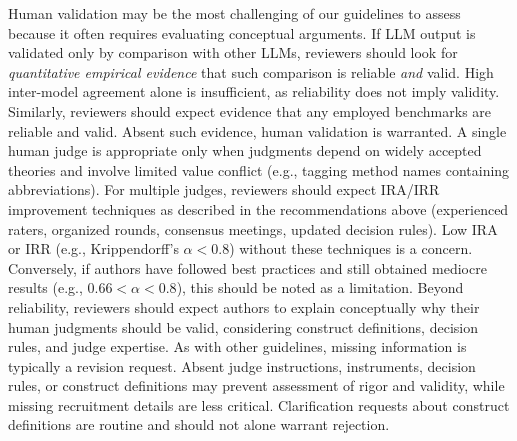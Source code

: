 Human validation may be the most challenging of our guidelines to assess because it often requires evaluating conceptual arguments. If LLM output is validated only by comparison with other LLMs, reviewers should look for \textit{quantitative empirical evidence} that such comparison is reliable \textit{and} valid. High inter-model agreement alone is insufficient, as reliability does not imply validity. Similarly, reviewers should expect evidence that any employed benchmarks are reliable and valid. Absent such evidence, human validation is warranted.
A single human judge is appropriate only when judgments depend on widely accepted theories and involve limited value conflict (e.g., tagging method names containing abbreviations). For multiple judges, reviewers should expect IRA/IRR improvement techniques as described in the recommendations above (experienced raters, organized rounds, consensus meetings, updated decision rules). Low IRA or IRR (e.g., Krippendorff's $\alpha<0.8$) without these techniques is a concern. Conversely, if authors have followed best practices and still obtained mediocre results (e.g., $0.66<\alpha<0.8$), this should be noted as a limitation.
Beyond reliability, reviewers should expect authors to explain conceptually why their human judgments should be valid, considering construct definitions, decision rules, and judge expertise.
As with other guidelines, missing information is typically a revision request. Absent judge instructions, instruments, decision rules, or construct definitions may prevent assessment of rigor and validity, while missing recruitment details are less critical. Clarification requests about construct definitions are routine and should not alone warrant rejection.